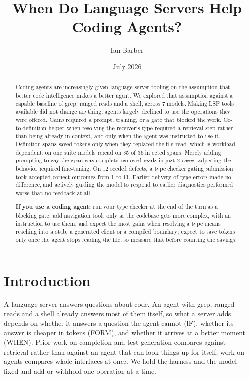 \documentclass[
]{article}
\title{When Do Language Servers Help Coding Agents?}
\author{Ian Barber}
\date{July 2026}
\begin{document}
\maketitle
\begin{abstract}
Coding agents are increasingly given language-server tooling on the
assumption that better code intelligence makes a better agent. We
explored that assumption against a capable baseline of grep, ranged
reads and a shell, across 7 models. Making LSP tools available did not
change anything: agents largely declined to use the operations they were
offered. Gains required a prompt, training, or a gate that blocked the
work. Go-to-definition helped when resolving the receiver's type
required a retrieval step rather than being already in context, and only
when the agent was instructed to use it. Definition spans saved tokens
only when they replaced the file read, which is workload dependent: on
one suite models reread on 35 of 36 injected spans. Merely adding
prompting to say the span was complete removed reads in just 2 cases:
adjusting the behavior required fine-tuning. On 12 seeded defects, a
type checker gating submission took accepted correct outcomes from 1 to
11. Earlier delivery of type errors made no difference, and actively
guiding the model to respond to earlier diagnostics performed worse than
no feedback at all.

\textbf{If you use a coding agent:} run your type checker at the end of
the turn as a blocking gate; add navigation tools only as the codebase
gets more complex, with an instruction to use them, and expect the most
gains when resolving a type means reaching into a stub, a generated
client or a compiled boundary; expect to save tokens only once the agent
stops reading the file, so measure that before counting the savings.
\end{abstract}

\section{Introduction}\label{introduction}

A language server answers questions about code. An agent with grep,
ranged reads and a shell already answers most of them itself, so what a
server adds depends on whether it answers a question the agent cannot
(IF), whether its answer is cheaper in tokens (FORM), and whether it
arrives at a better moment (WHEN). Prior work on completion and test
generation compares against retrieval rather than against an agent that
can look things up for itself; work on agents compares whole interfaces
at once. We hold the harness and the model fixed and add or withhold one
operation at a time.
\end{document}
